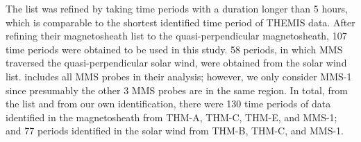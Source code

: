 The list \cite{ToyEdens:2024} was refined by taking time periods with a duration longer than 5 hours, which is comparable to the shortest identified time period of THEMIS data. 
After refining their magnetosheath list to the quasi-perpendicular magnetosheath, 107 time periods were obtained to be used in this study. 58 periods, in which MMS traversed the quasi-perpendicular solar wind, were obtained from the \cite{ToyEdens:2024} solar wind list. \cite{ToyEdens2:2024} includes all MMS probes in their analysis; however, we only consider MMS-1 since presumably the other 3 MMS probes are in the same region. In total, from the \cite{ToyEdens:2024} list and from our own identification, there were 130 time periods of data identified in the magnetosheath from THM-A, THM-C, THM-E, and MMS-1; and 77 periods identified in the solar wind from THM-B, THM-C, and MMS-1.

